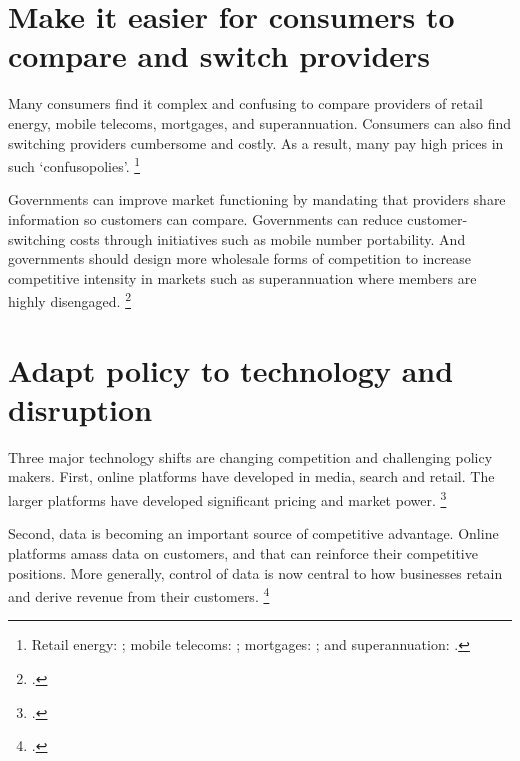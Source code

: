 \section {Make it easier for consumers to compare and switch providers}

Many consumers find it complex and confusing to compare providers of retail energy, mobile telecoms, mortgages, and superannuation. Consumers can also find switching providers cumbersome and costly. As a result, many pay high prices in such `confusopolies'.%
\footnote{Retail energy: \textcites{WoodBlowers-2017-price-shock}{Bendavid-cosmonaut-15}; mobile telecoms: \textcite{Gans-2005-Confusopoly}; mortgages: \textcite{Bankhaggle_2017}; and superannuation: \textcite{MinifieSavageCameron-2015-Super-savings}.} 
 
Governments can improve market functioning by mandating that providers share information so customers can compare. Governments can reduce customer-switching costs through initiatives such as mobile number portability. And governments should design more wholesale forms of competition to increase competitive intensity in markets such as superannuation where members are highly disengaged.%
\footcite{MinifieSavageCameron-2015-Super-savings}

\section{Adapt policy to technology and disruption}

Three major technology shifts are changing competition and challenging policy makers. First, online platforms have developed in media, search and retail. The larger platforms have developed significant pricing and market power.%
\footcites{EconData2017}

\CenturyFootnote

Second, data is becoming an important source of competitive advantage. Online platforms amass data on customers, and that can reinforce their competitive positions. More generally, control of data is now central to how businesses retain and derive revenue from their customers. \footcite{EconData2017}

